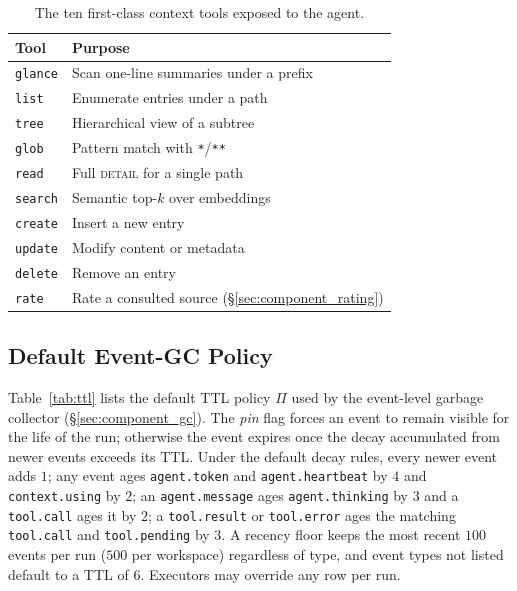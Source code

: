 \begin{table}[h]
    \centering
    \small
    \begin{tabular}{ll}
        \toprule
        Tool & Purpose \\
        \midrule
        \texttt{glance}  & Scan one-line summaries under a prefix \\
        \texttt{list}    & Enumerate entries under a path \\
        \texttt{tree}    & Hierarchical view of a subtree \\
        \texttt{glob}    & Pattern match with \texttt{*}/\texttt{**} \\
        \texttt{read}    & Full \textsc{detail} for a single path \\
        \texttt{search}  & Semantic top-$k$ over embeddings \\
        \texttt{create}  & Insert a new entry \\
        \texttt{update}  & Modify content or metadata \\
        \texttt{delete}  & Remove an entry \\
        \texttt{rate}    & Rate a consulted source (\S\ref{sec:component_rating}) \\
        \bottomrule
    \end{tabular}
    \caption{The ten first-class context tools exposed to the agent.}
    \label{tab:tools}
\end{table}

\subsection{Default Event-GC Policy}
\label{sec:appendix_gc_policy}

Table~\ref{tab:ttl} lists the default TTL policy $\Pi$ used by the
event-level garbage collector (\S\ref{sec:component_gc}). The
\emph{pin} flag forces an event to remain visible for the life of the
run; otherwise the event expires once the decay accumulated from newer
events exceeds its TTL. Under the default decay rules, every newer
event adds $1$; any event ages \texttt{agent.token} and
\texttt{agent.heartbeat} by $4$ and \texttt{context.using} by $2$; an
\texttt{agent.message} ages \texttt{agent.thinking} by $3$ and a
\texttt{tool.call} ages it by $2$; a \texttt{tool.result} or
\texttt{tool.error} ages the matching \texttt{tool.call} and
\texttt{tool.pending} by $3$. A recency floor keeps the most recent
$100$ events per run ($500$ per workspace) regardless of type, and
event types not listed default to a TTL of $6$. Executors may override
any row per run.


